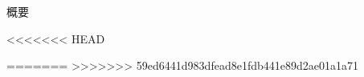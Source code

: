 \documentclass[twoside,openright,a4paper,papersize,uplatex,dvipdfmx]{jsbook}
\begin{document}


\frontmatter

\maketitle

\thispagestyle{empty}

\begin{center}
  {\large \sf 概要}
\end{center}



\tableofcontents
\listoffigures
\listoftables

\mainmatter

<<<<<<< HEAD



%





=======
>>>>>>> 59ed6441d983dfead8e1fdb441e89d2ae01a1a71

\renewcommand{\bibname}{引用文献}


\label{page:bib}
\end{document}

